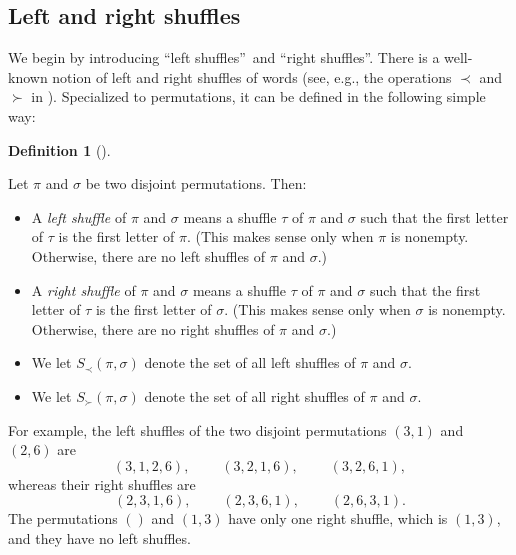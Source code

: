 \documentclass[numbers=enddot,12pt,final,onecolumn,notitlepage]{scrartcl}%
\theoremstyle{definition}
\newtheorem{defi}[theo]{Definition}
\newenvironment{definition}[1][]
{\begin{defi}[#1]\begin{leftbar}}
{\end{leftbar}\end{defi}}
\begin{document}
\subsection{Left and right shuffles}

We begin by introducing \textquotedblleft left shuffles\textquotedblright\ and
\textquotedblleft right shuffles\textquotedblright. There is a well-known
notion of left and right shuffles of words (see, e.g., the operations $\prec$
and $\succ$ in \cite[Example 1]{EbMaPa07}). Specialized to permutations, it
can be defined in the following simple way:

\begin{definition}
\label{def.LRshuf}Let $\pi$ and $\sigma$ be two disjoint permutations. Then:

\begin{itemize}
\item A \textit{left shuffle} of $\pi$ and $\sigma$ means a shuffle $\tau$ of
$\pi$ and $\sigma$ such that the first letter of $\tau$ is the first letter of
$\pi$. (This makes sense only when $\pi$ is nonempty. Otherwise, there are no
left shuffles of $\pi$ and $\sigma$.)

\item A \textit{right shuffle} of $\pi$ and $\sigma$ means a shuffle $\tau$ of
$\pi$ and $\sigma$ such that the first letter of $\tau$ is the first letter of
$\sigma$. (This makes sense only when $\sigma$ is nonempty. Otherwise, there
are no right shuffles of $\pi$ and $\sigma$.)

\item We let $S_{\prec}\left(  \pi,\sigma\right)  $ denote the set of all left
shuffles of $\pi$ and $\sigma$.

\item We let $S_{\succ}\left(  \pi,\sigma\right)  $ denote the set of all
right shuffles of $\pi$ and $\sigma$.
\end{itemize}
\end{definition}

For example, the left shuffles of the two disjoint permutations $\left(
3,1\right)  $ and $\left(  2,6\right)  $ are%
\[
\left(  3,1,2,6\right)  ,\ \ \ \ \ \ \ \ \ \ \left(  3,2,1,6\right)
,\ \ \ \ \ \ \ \ \ \ \left(  3,2,6,1\right)  ,
\]
whereas their right shuffles are%
\[
\left(  2,3,1,6\right)  ,\ \ \ \ \ \ \ \ \ \ \left(  2,3,6,1\right)
,\ \ \ \ \ \ \ \ \ \ \left(  2,6,3,1\right)  .
\]
The permutations $\left(  {}\right)  $ and $\left(  1,3\right)  $ have only
one right shuffle, which is $\left(  1,3\right)  $, and they have no left shuffles.
\end{document}
